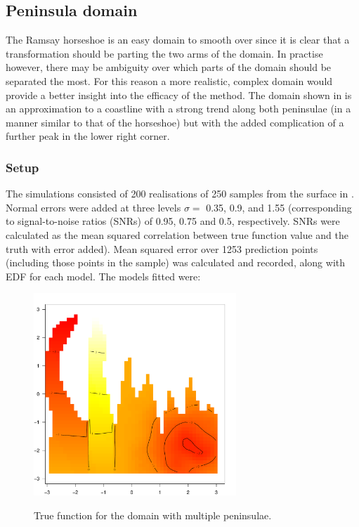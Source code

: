 {\subsection{Peninsula domain}
\label{mds-wt2-sim}

The Ramsay horseshoe is an easy domain to smooth over since it is clear that a transformation should be parting the two arms of the domain. In practise however, there may be ambiguity over which parts of the domain should be separated the most. For this reason a more realistic, complex domain would provide a better insight into the efficacy of the method. The domain shown in  is an approximation to a coastline with a strong trend along both peninsulae (in a manner similar to that of the horseshoe) but with the added complication of a further peak in the lower right corner.

\subsubsection{Setup}

The simulations consisted of 200 realisations of 250 samples from the surface in . Normal errors were added at three levels $\sigma=$ 0.35, 0.9, and 1.55 (corresponding to signal-to-noise ratios (SNRs) of 0.95, 0.75 and 0.5, respectively. SNRs were calculated as the mean squared correlation between true function value and the truth with error added). Mean squared error over 1253 prediction points (including those points in the sample) was calculated and recorded, along with EDF for each model. The models fitted were:

\begin{figure}
\centering
\includegraphics[width=3in]{mds/figs/wt2-truth.pdf} \\
\caption{True function for the domain with multiple peninsulae.}
\label{wt2-truth}
\end{figure}

}
